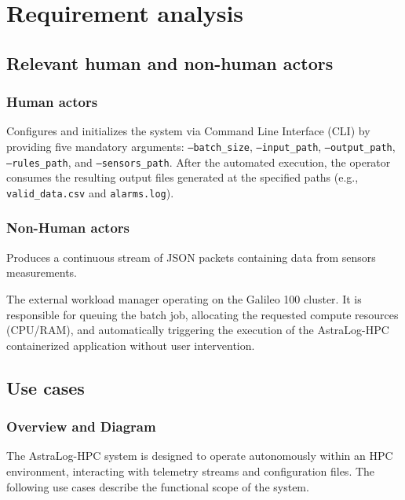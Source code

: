 \documentclass[11pt, a4paper]{article}
\begin{document}
\newpage
\section{Requirement analysis}

\subsection{Relevant human and non-human actors}
\subsubsection{Human actors}
\begin{description}[align=left, leftmargin=2cm]
    \item[\textbf{System Operator:}] Configures and initializes the system via Command Line Interface (CLI) by providing five mandatory arguments: \texttt{--batch\_size}, \texttt{--input\_path}, \texttt{--output\_path}, \texttt{--rules\_path}, and \texttt{--sensors\_path}. After the automated execution, the operator consumes the resulting output files generated at the specified paths (e.g., \texttt{valid\_data.csv} and \texttt{alarms.log}).
\end{description}

\subsubsection{Non-Human actors}
\begin{description}[align=left, leftmargin=2cm]
    \item[\textbf{Spacecraft Master System:}] Produces a continuous stream of JSON packets containing data from sensors measurements.
    \item[\textbf{SLURM Job Scheduler:}] The external workload manager operating on the Galileo 100 cluster. It is responsible for queuing the batch job, allocating the requested compute resources (CPU/RAM), and automatically triggering the execution of the AstraLog-HPC containerized application without user intervention.
\end{description}

\subsection{Use cases}


\subsubsection{Overview and Diagram}
The AstraLog-HPC system is designed to operate autonomously within an HPC environment, interacting with telemetry streams and configuration files. The following use cases describe the functional scope of the system.
\end{document}
